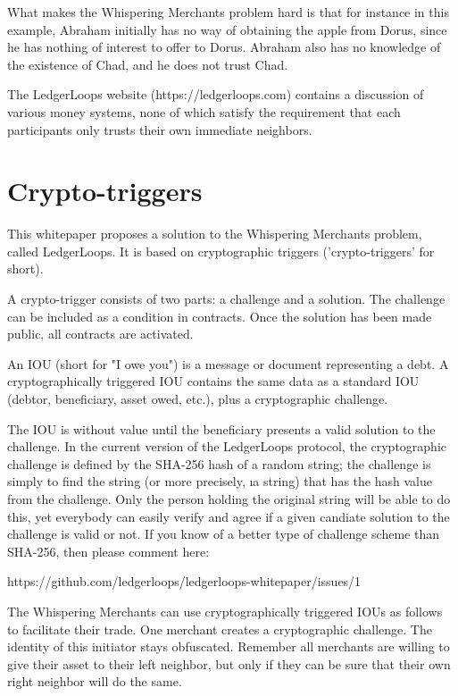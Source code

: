 \documentclass[11pt,twoside,a4paper]{article}
\begin{document}
What makes the Whispering Merchants problem hard is that for instance in this example, Abraham initially has no way of obtaining the apple from Dorus, since he has nothing of interest to offer to Dorus. Abraham also has no knowledge of the existence of Chad, and he does not trust Chad.

The LedgerLoops website (https://ledgerloops.com) contains a discussion of various money systems, none of which satisfy the requirement that each participants only trusts their own immediate neighbors.

\section{Crypto-triggers}
This whitepaper proposes a solution to the Whispering Merchants problem, called LedgerLoops. It is based on cryptographic triggers ('crypto-triggers' for short).

A crypto-trigger consists of two parts: a challenge and a solution. The challenge can be included as a condition in contracts. Once the solution has been made public, all contracts are activated.

An IOU (short for "I owe you") is a message or document representing a debt.
A cryptographically triggered IOU contains the same data as a standard IOU (debtor, beneficiary, asset owed, etc.), plus a cryptographic challenge.

The IOU is without value until the beneficiary presents a valid solution to the challenge. In the current version of the LedgerLoops protocol, the cryptographic challenge is defined by the SHA-256 hash of a random string; the challenge is simply to find the string (or more precisely, {\i a} string) that has the hash value from the challenge. Only the person holding the original string will be able to do this, yet everybody can easily verify and agree if a given candiate solution to the challenge is valid or not. If you know of a better type of challenge scheme than SHA-256, then please comment here:

https://github.com/ledgerloops/ledgerloops-whitepaper/issues/1

The Whispering Merchants can use cryptographically triggered IOUs as follows to facilitate their trade. One merchant creates a cryptographic challenge. The identity of this initiator stays obfuscated. Remember all merchants are willing to give their asset to their left neighbor, but only if they can be sure that their own right neighbor will do the same.
\end{document}
